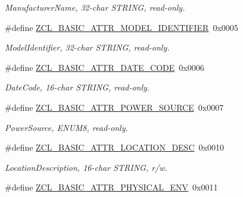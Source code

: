 \begin{DoxyCompactItemize}
\begin{DoxyCompactList}\small\item\em Manufacturer\-Name, 32-\/char S\-T\-R\-I\-N\-G, read-\/only. \end{DoxyCompactList}\item 
\hypertarget{group__zcl__basic_gad6e74db6f2936706976045dee1c43cf2}{\#define \hyperlink{group__zcl__basic_gad6e74db6f2936706976045dee1c43cf2}{Z\-C\-L\-\_\-\-B\-A\-S\-I\-C\-\_\-\-A\-T\-T\-R\-\_\-\-M\-O\-D\-E\-L\-\_\-\-I\-D\-E\-N\-T\-I\-F\-I\-E\-R}~0x0005}\label{group__zcl__basic_gad6e74db6f2936706976045dee1c43cf2}

\begin{DoxyCompactList}\small\item\em Model\-Identifier, 32-\/char S\-T\-R\-I\-N\-G, read-\/only. \end{DoxyCompactList}\item 
\hypertarget{group__zcl__basic_gadfa72f9d6ff3d467de6a51314ab2cce8}{\#define \hyperlink{group__zcl__basic_gadfa72f9d6ff3d467de6a51314ab2cce8}{Z\-C\-L\-\_\-\-B\-A\-S\-I\-C\-\_\-\-A\-T\-T\-R\-\_\-\-D\-A\-T\-E\-\_\-\-C\-O\-D\-E}~0x0006}\label{group__zcl__basic_gadfa72f9d6ff3d467de6a51314ab2cce8}

\begin{DoxyCompactList}\small\item\em Date\-Code, 16-\/char S\-T\-R\-I\-N\-G, read-\/only. \end{DoxyCompactList}\item 
\hypertarget{group__zcl__basic_ga566025cbf5bb2560164d45c221226844}{\#define \hyperlink{group__zcl__basic_ga566025cbf5bb2560164d45c221226844}{Z\-C\-L\-\_\-\-B\-A\-S\-I\-C\-\_\-\-A\-T\-T\-R\-\_\-\-P\-O\-W\-E\-R\-\_\-\-S\-O\-U\-R\-C\-E}~0x0007}\label{group__zcl__basic_ga566025cbf5bb2560164d45c221226844}

\begin{DoxyCompactList}\small\item\em Power\-Source, E\-N\-U\-M8, read-\/only. \end{DoxyCompactList}\item 
\hypertarget{group__zcl__basic_ga6fde53674c021d134286c43d77514a22}{\#define \hyperlink{group__zcl__basic_ga6fde53674c021d134286c43d77514a22}{Z\-C\-L\-\_\-\-B\-A\-S\-I\-C\-\_\-\-A\-T\-T\-R\-\_\-\-L\-O\-C\-A\-T\-I\-O\-N\-\_\-\-D\-E\-S\-C}~0x0010}\label{group__zcl__basic_ga6fde53674c021d134286c43d77514a22}

\begin{DoxyCompactList}\small\item\em Location\-Description, 16-\/char S\-T\-R\-I\-N\-G, r/w. \end{DoxyCompactList}\item 
\hypertarget{group__zcl__basic_gafcbb476a4db9587ae36001a2dcd417fd}{\#define \hyperlink{group__zcl__basic_gafcbb476a4db9587ae36001a2dcd417fd}{Z\-C\-L\-\_\-\-B\-A\-S\-I\-C\-\_\-\-A\-T\-T\-R\-\_\-\-P\-H\-Y\-S\-I\-C\-A\-L\-\_\-\-E\-N\-V}~0x0011}\label{group__zcl__basic_gafcbb476a4db9587ae36001a2dcd417fd}


\end{DoxyCompactItemize}
